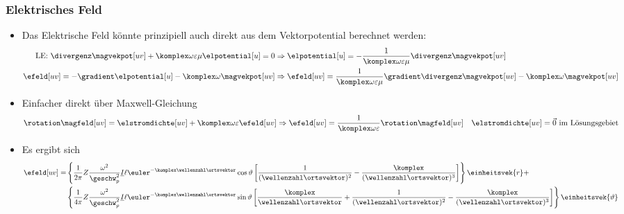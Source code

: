 \begin{frame}
  \frametitle{Elektrisches Feld}
  \begin{itemize}[<+->]
  \item Das Elektrische Feld könnte prinzipiell auch direkt aus dem Vektorpotential berechnet werden:
    \begin{align*}
      \text{LE: } \divergenz\magvekpot[uv] + \komplex \omega \varepsilon\mu \elpotential[u]  = 0 &\Rightarrow \elpotential[u] = -\frac{1}{\komplex \omega \varepsilon\mu} \divergenz\magvekpot[uv]\\
      \efeld[uv] = -\gradient \elpotential[u] - \komplex \omega \magvekpot[uv] &\Rightarrow \efeld[uv]  = \frac{1}{\komplex \omega \varepsilon\mu} \gradient \divergenz\magvekpot[uv]- \komplex \omega \magvekpot[uv]    
    \end{align*}
  \item Einfacher direkt über Maxwell-Gleichung
    \begin{equation*}
      \rotation \magfeld[uv] = \elstromdichte[uv] + \komplex\omega\varepsilon\efeld[uv] \Rightarrow \efeld[uv] = \frac{1}{\komplex\omega\varepsilon} \rotation \magfeld[uv] \quad \elstromdichte[uv] = \vec{0} \text{ im Lösungsgebiet} 
    \end{equation*}
  \item Es ergibt sich
    \begin{align*}
      \efeld[uv] = &\left\{\frac{1}{2\pi} Z \frac{\omega^2}{\geschw_p^2}\underline{I} \ell  \euler^{-\komplex\wellenzahl\ortsvektor} \cos\vartheta\left[\frac{1}{(\wellenzahl\ortsvektor)^2} - \frac{\komplex}{(\wellenzahl\ortsvektor)^3}\right]\right\} \einheitsvek{r} + \\
      &\left\{ \frac{1}{4\pi} Z \frac{\omega^2}{\geschw_p^2}\underline{I} \ell  \euler^{-\komplex\wellenzahl\ortsvektor} \sin\vartheta\left[\frac{\komplex}{\wellenzahl\ortsvektor}  + \frac{1}{(\wellenzahl\ortsvektor)^2} - \frac{\komplex}{(\wellenzahl\ortsvektor)^3} \right] \right\} \einheitsvek{\vartheta}
      \end{align*}
  \end{itemize}
\end{frame}

